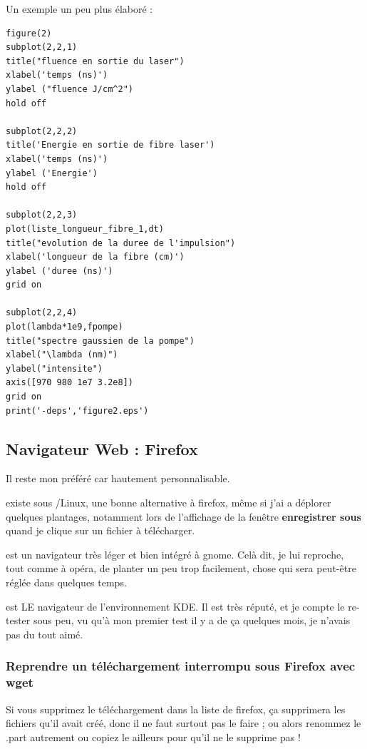 \documentclass[a4paper,twoside]{article}
\begin{document}
Un exemple un peu plus élaboré :
\begin{verbatim}
figure(2)
subplot(2,2,1)
title("fluence en sortie du laser")
xlabel('temps (ns)')
ylabel ("fluence J/cm^2")
hold off

subplot(2,2,2)
title('Energie en sortie de fibre laser')
xlabel('temps (ns)')
ylabel ('Energie')
hold off

subplot(2,2,3)
plot(liste_longueur_fibre_1,dt)
title("evolution de la duree de l'impulsion")
xlabel('longueur de la fibre (cm)')
ylabel ('duree (ns)')
grid on

subplot(2,2,4)
plot(lambda*1e9,fpompe)
title("spectre gaussien de la pompe")
xlabel("\lambda (nm)")
ylabel("intensite")
axis([970 980 1e7 3.2e8])
grid on
print('-deps','figure2.eps')
\end{verbatim}


\subsection{Navigateur Web : Firefox}
 Il reste mon préféré car hautement personnalisable.

 existe sous /Linux, une bonne alternative à firefox, même si j'ai a déplorer quelques plantages, notamment lors de l'affichage de la fenêtre \textbf{enregistrer sous} quand je clique sur un fichier à télécharger.

 est un navigateur très léger et bien intégré à gnome. Celà dit, je lui reproche, tout comme à opéra, de planter un peu trop facilement, chose qui sera peut-être réglée dans quelques temps.

 est LE navigateur de l'environnement KDE. Il est très réputé, et je compte le re-tester sous peu, vu qu'à mon premier test il y a de ça quelques mois, je n'avais pas du tout aimé.

\subsubsection{Reprendre un téléchargement interrompu sous Firefox avec wget}

\begin{attention}
Si vous supprimez le téléchargement dans la liste de firefox, ça supprimera les fichiers qu'il avait créé, donc il ne faut surtout pas le faire ; ou alors renommez le .part autrement ou copiez le ailleurs pour qu'il ne le supprime pas !
\end{attention}
\end{document}
